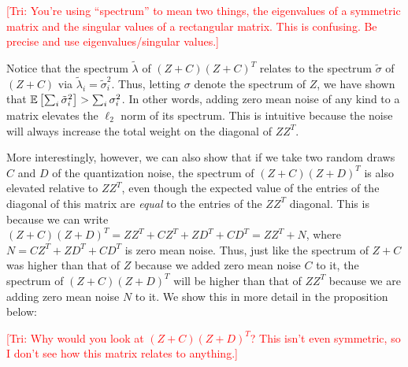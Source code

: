 \documentclass[12pt]{article}
\newcommand\tri[1]{\textcolor{red}{[Tri: #1]}}
\newcommand{\tsigma}{\tilde{\sigma}}
\newcommand{\tlambda}{\tilde{\lambda}}
\begin{document}
\tri{You're using ``spectrum'' to mean two things, the eigenvalues of a
symmetric matrix and the singular values of a rectangular matrix. This is
confusing. Be precise and use eigenvalues/singular values.}

Notice that the spectrum $\tlambda$ of $(Z+C)(Z+C)^T$ relates to the spectrum $\tsigma$ of $(Z+C)$ via $\tlambda_i = \tsigma_i^2$.  Thus, letting $\sigma$ denote the spectrum of $Z$, we have shown that
$\expect{}{\sum_i \tsigma_i^2} > \sum_i \sigma_i^2$.  In other words, adding zero mean noise of any kind to a matrix elevates the $\ell_2$ norm of its spectrum.  This is intuitive because the noise will always increase the total weight on the diagonal of $ZZ^T$.

More interestingly, however, we can also show that if we take two random draws $C$ and $D$ of the quantization noise, the spectrum of $(Z+C)(Z+D)^T$ is also elevated relative to $ZZ^T$, even though the expected value of the entries of the diagonal of this matrix are \textit{equal} to the entries of the $ZZ^T$ diagonal.  This is because we can write $(Z+C)(Z+D)^T = ZZ^T + CZ^T + ZD^T + CD^T = ZZ^T + N$, where $N = CZ^T + ZD^T + CD^T$ is zero mean noise.  Thus, just like the spectrum of $Z+C$ was higher than that of $Z$ because we added zero mean noise $C$ to it, the spectrum of $(Z+C)(Z+D)^T$ will be higher than that of $ZZ^T$ because we are adding zero mean noise $N$ to it.  We show this in more detail in the proposition below:

\tri{Why would you look at $(Z + C) (Z + D)^T$? This isn't even symmetric, so I
  don't see how this matrix relates to anything.}
\end{document}
